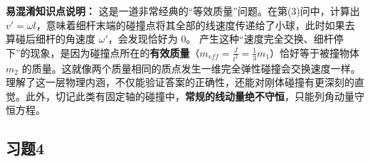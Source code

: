 \vspace{1em}

\textbf{易混淆知识点说明：}
这是一道非常经典的“等效质量”问题。在第(3)问中，计算出 $v' = \omega l$，意味着细杆末端的碰撞点将其全部的线速度传递给了小球，此时如果去算碰后细杆的角速度 $\omega'$，会发现恰好为 $0$。
产生这种“速度完全交换、细杆停下”的现象，是因为碰撞点所在的\textbf{有效质量}（$m_{eff} = \frac{J}{l^2} = \frac{1}{3}m_1$）恰好等于被撞物体 $m_2$ 的质量。这就像两个质量相同的质点发生一维完全弹性碰撞会交换速度一样。理解了这一层物理内涵，不仅能验证答案的正确性，还能对刚体碰撞有更深刻的直觉。此外，切记此类有固定轴的碰撞中，\textbf{常规的线动量绝不守恒}，只能列角动量守恒方程。
\newpage

\subsection{习题4}

